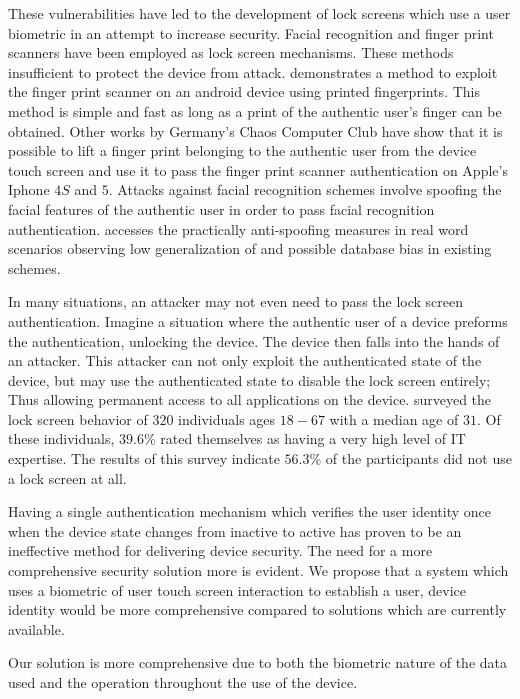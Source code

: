 These vulnerabilities have led to the development of 
lock screens which 
use a user biometric in an attempt to increase security.
Facial recognition and finger print scanners have
been employed as lock screen mechanisms.
These methods insufficient to protect the device from attack.
%
\cite{cao2016hacking} demonstrates a method 
to exploit the finger print scanner on an android device
using printed fingerprints.
This method is simple and fast as long as a print of the
authentic user's finger can be obtained.
%
Other works by Germany's Chaos Computer Club \cite{CHAOS}
have show that it is possible to lift a finger print 
belonging to the authentic user from the device touch screen
and use it to pass the finger print scanner authentication on Apple's Iphone $4S$ and $5$. 
%
Attacks against facial recognition schemes involve
spoofing the facial features of the authentic user
in order to pass facial recognition authentication.
\cite{de2013can}
accesses the practically anti-spoofing measures in real word scenarios
observing 
low generalization of
and possible database bias in existing schemes.

In many situations,
an attacker may not even need to pass the lock screen authentication.
Imagine a situation where the authentic user of a device preforms the authentication,
unlocking the device.
The device then falls into the hands of an attacker.
This attacker can not only exploit the authenticated state of the device,
but may use the authenticated state to disable the lock screen entirely;
Thus allowing permanent access to all applications on the device.
%
\cite{harbach2014sa} surveyed the lock screen behavior of $320$
individuals ages $18 - 67$ with a median age of $31$.
Of these individuals, $39.6\%$  rated themselves as having
a very high level of IT expertise.
The results of this survey indicate $56.3\%$ of the participants
did not use a lock screen at all.


Having a single authentication mechanism which
verifies the user identity once when the device
state changes from inactive to active has
proven to be an ineffective method for 
delivering device security.
%
The need for a more comprehensive security solution more is evident.
%
We propose that a system which uses
a biometric of user touch screen interaction to
establish a user, device identity would 
be more comprehensive compared to solutions 
which are currently available.

Our solution is more comprehensive due to
both 
the biometric nature of the data used and
the operation throughout the use of the device.
%
